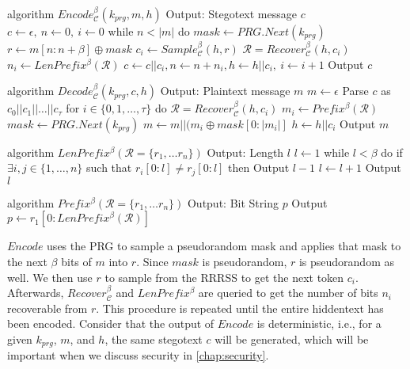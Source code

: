 \begin{Pseudocode}[caption={$Encode$ algorithm \cite{Meteor2021}}, label={alg:encode}]
algorithm $Encode_{\mathcal{C}}^\beta(k_{prg}, m, h)$
  Output: Stegotext message $c$
  $c \leftarrow \epsilon,~ n \leftarrow 0,~ i \leftarrow 0$
  while $n < |m|$ do
    $mask \leftarrow PRG.Next(k_{prg})$
    $r \leftarrow m[n:n+\beta] \oplus mask$
    $c_i \leftarrow Sample_{\mathcal{C}}^\beta(h, r)$
    $\mathcal{R} = Recover_{\mathcal{C}}^\beta(h, c_i)$
    $n_i \leftarrow LenPrefix^\beta(\mathcal{R})$
    $c \leftarrow c || c_i, n \leftarrow n+n_i, h \leftarrow h||c_i,~ i \leftarrow i + 1$
  Output $c$
\end{Pseudocode}%
\newpage
\begin{Pseudocode}[float, caption={$Decode$ algorithm \cite{Meteor2021}}, label={alg:decode}]
algorithm $Decode_{\mathcal{C}}^\beta(k_{prg}, c, h)$
  Output: Plaintext message $m$
  $m \leftarrow \epsilon$
  Parse $c$ as $c_0 || c_1 || \dots || c_{\tau}$
  for $i \in \{ 0, 1, \dots, \tau \}$ do
    $\mathcal{R} = Recover_{\mathcal{C}}^\beta(h, c_i)$
    $m_i \leftarrow Prefix^\beta(\mathcal{R})$
    $mask \leftarrow PRG.Next(k_{prg})$
    $m \leftarrow m || (m_i \oplus mask[0: |m_i|]$
    $h \leftarrow h||c_i$
  Output $m$
\end{Pseudocode}%

\begin{Pseudocode}[caption={$LenPrefix$ algorithm \cite{Meteor2021}}]
algorithm $LenPrefix^\beta(\mathcal R = \{ r_1, \dots r_n \})$
  Output: Length $l$
  $l \leftarrow 1$
  while $l < \beta$ do
    if $\exists i, j \in \{ 1, \dots, n \}$ such that $r_i[0: l] \neq r_j[0:  l]$ then
      Output $l-1$
    $l \leftarrow l+1$
  Output $l$
\end{Pseudocode}%

\begin{Pseudocode}[caption={$Prefix$ algorithm \cite{Meteor2021}}]
algorithm $Prefix^\beta(  \mathcal R = \{ r_1, \dots r_n \})$
  Output: Bit String $p$
  Output $p \leftarrow r_1[0: LenPrefix^\beta(\mathcal{R})]$
\end{Pseudocode}%

$Encode$ uses the PRG to sample a pseudorandom mask and applies that mask to the next $\beta$ bits of $m$ into $r$.
Since $mask$ is pseudorandom, $r$ is pseudorandom as well.
We then use $r$ to sample from the RRRSS to get the next token $c_i$.
Afterwards, $Recover_{\mathcal{C}}^\beta$ and $LenPrefix^\beta$ are queried to get the number of bits $n_i$ recoverable from $r$.
This procedure is repeated until the entire hiddentext has been encoded.
Consider that the output of $Encode$ is deterministic, i.e., for a given $k_{prg}$, $m$, and $h$, the same stegotext $c$ will be generated, which will be important when we discuss security in \autoref{chap:security}.


